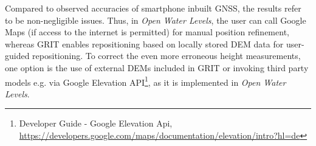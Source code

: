 \documentclass[review]{elsarticle}
\begin{document}
Compared to observed accuracies of smartphone inbuilt \gls{GNSS}, the results refer to be non-negligible issues. Thus, in \textit{Open Water Levels}, the user can call Google Maps (if access to the internet is permitted) for manual position refinement, whereas \gls{GRIT} enables repositioning based on locally stored \gls{DEM} data for user-guided repositioning. To correct the even more erroneous height measurements, one option is the use of external \glspl{DEM} included in \gls{GRIT} or invoking third party models e.g. via Google Elevation API\footnote{Developer Guide - Google Elevation Api, \url{https://developers.google.com/maps/documentation/elevation/intro?hl=de}}, as it is implemented in \textit{Open Water Levels}.

\begin{figure}[htbp!]
\begin{center}
	 	\begin{minipage}{\columnwidth}
	 		\centering
	 	\end{minipage}
	 	\begin{minipage}{\columnwidth}
	 		\centering
	 	\end{minipage}
	 	\begin{minipage}{\columnwidth}

\end{minipage}
\end{center}
\end{figure}
\end{document}
